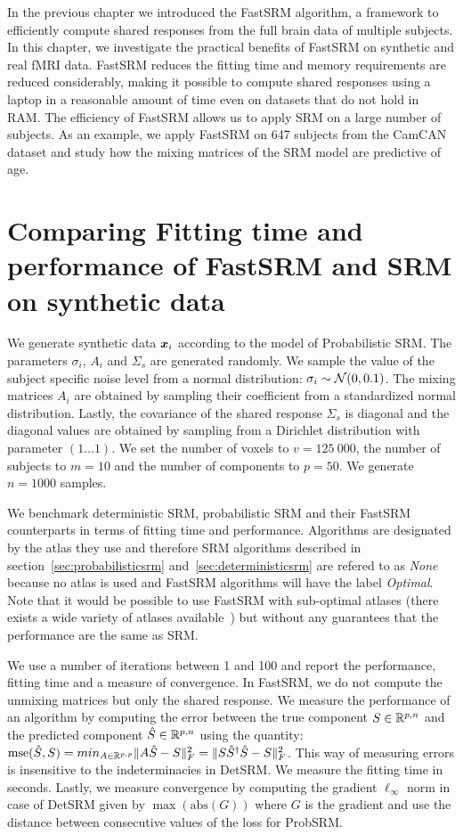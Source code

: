 In the previous chapter we introduced the FastSRM algorithm, a framework to
efficiently compute shared responses from the full brain data of multiple
subjects. In this chapter, we
investigate the practical benefits of FastSRM on synthetic and real fMRI data.
FastSRM reduces the fitting time
and memory requirements are reduced considerably, making it possible to compute
shared responses using a laptop in a reasonable amount of time even on
datasets that do not hold in RAM. The efficiency of FastSRM allows us to apply
SRM on a large number of subjects. As an example, we apply FastSRM on 647
subjects from the CamCAN dataset and study how the mixing matrices of the SRM
model are predictive of age.


\section{Comparing Fitting time and performance of FastSRM and
  SRM on synthetic data}
We generate synthetic data $\boldsymbol{x}_i$ according to the model of Probabilistic SRM.
The parameters $\sigma_i$, $A_i$ and $\Sigma_s$ are generated randomly. We sample the value of the subject specific noise level from a normal
distribution: $\sigma_i \sim \mathcal{N}(0, 0.1)$. The mixing matrices $A_i$
are obtained by sampling their coefficient from a standardized normal distribution.
Lastly, the covariance of the shared response $\Sigma_s$ is diagonal and the
diagonal values are obtained by sampling from a Dirichlet distribution with
parameter $(1 \dots 1)$.
We set the number of voxels to $v=125~000$, the number of subjects to $m=10$ and
the number of components to $p=50$. We generate $n=1000$ samples.

We benchmark deterministic SRM, probabilistic
SRM and their FastSRM counterparts in terms of fitting time and performance.
Algorithms are designated by the atlas they use and therefore SRM algorithms described in
section~\ref{sec:probabilisticsrm} and~\ref{sec:deterministicsrm} are refered to
as \emph{None} because no atlas is used and FastSRM algorithms will have the
label \emph{Optimal}. Note that it would be possible to use FastSRM with sub-optimal
atlases (there exists a wide variety of atlases
available~\cite{schaefer2017local, bellec2010multi, mensch2018extracting}) but
without any guarantees that the performance are the same as SRM.


We use a number of iterations between 1 and 100 and report the performance,
fitting time and a measure of convergence. In FastSRM, we do not compute the
unmixing matrices but only the shared response.
We measure the performance of an algorithm by computing the error between the true component $S \in \mathbb{R}^{p, n}$ and
the predicted component $\hat{S} \in \mathbb{R}^{p, n}$ using the quantity:
$\mathrm{mse}(\hat{S}, S) = min_{A \in \mathbb{R}^{p, p}} \|A \hat{S} - S \|^2_F =  \|S
\hat{S}^{\dagger}\hat{S} - S \|^2_F$. This way of measuring errors is
insensitive to the indeterminacies in DetSRM.
We measure the fitting time in seconds.
Lastly, we measure convergence by computing the gradient $\ell_{\infty}$ norm in
case of DetSRM given by $\max(\mathrm{abs}(G))$ where $G$ is the gradient and
use the distance between consecutive values of the loss for ProbSRM.

